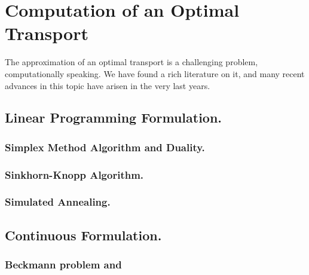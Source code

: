 \chapter{Computation of an Optimal Transport}
The approximation of an optimal transport is a challenging problem, computationally speaking. We have found a rich literature on it, and many recent advances in this topic have arisen in the very last years. 
\section{Linear Programming Formulation.}
\subsection{Simplex Method Algorithm and Duality.}
\subsection{Sinkhorn-Knopp Algorithm.}
\subsection{Simulated Annealing.}
\section{Continuous Formulation.}
\subsection{Beckmann problem and }

